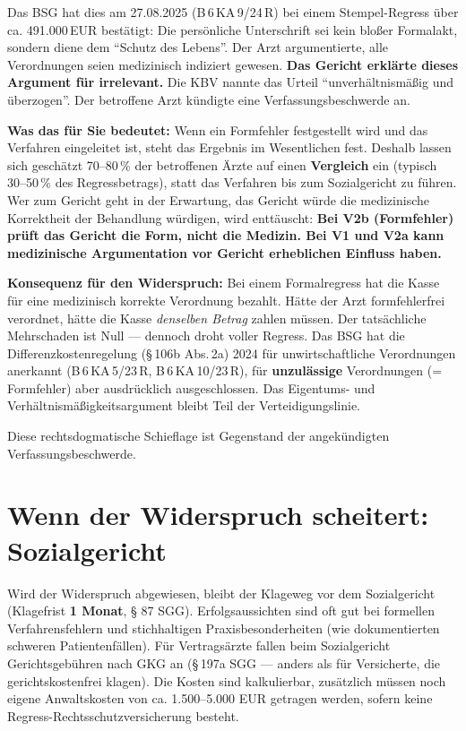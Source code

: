 \documentclass[a4paper]{umbruch-position}
\begin{document}
Das BSG hat dies am 27.08.2025 (B\,6\,KA\,9/24\,R) bei einem Stempel-Regress \"uber ca. 491.000\,EUR best\"atigt: Die pers\"onliche Unterschrift sei kein blo\ss{}er Formalakt, sondern diene dem ``Schutz des Lebens''. Der Arzt argumentierte, alle Verordnungen seien medizinisch indiziert gewesen. \textbf{Das Gericht erkl\"arte dieses Argument f\"ur irrelevant.} Die KBV nannte das Urteil ``unverh\"altnism\"a\ss{}ig und \"uberzogen''. Der betroffene Arzt k\"undigte eine Verfassungsbeschwerde an.

\textbf{Was das f\"ur Sie bedeutet:} Wenn ein Formfehler festgestellt wird und das Verfahren eingeleitet ist, steht das Ergebnis im Wesentlichen fest. Deshalb lassen sich gesch\"atzt 70--80\,\% der betroffenen \"Arzte auf einen \textbf{Vergleich} ein (typisch 30--50\,\% des Regressbetrags), statt das Verfahren bis zum Sozialgericht zu f\"uhren. Wer zum Gericht geht in der Erwartung, das Gericht w\"urde die medizinische Korrektheit der Behandlung w\"urdigen, wird entt\"auscht: \textbf{Bei V2b (Formfehler) pr\"uft das Gericht die Form, nicht die Medizin. Bei V1 und V2a kann medizinische Argumentation vor Gericht erheblichen Einfluss haben.}

\textbf{Konsequenz f\"ur den Widerspruch:} Bei einem Formalregress hat die Kasse f\"ur eine medizinisch korrekte Verordnung bezahlt. H\"atte der Arzt formfehlerfrei verordnet, h\"atte die Kasse \textit{denselben Betrag} zahlen m\"ussen. Der tats\"achliche Mehrschaden ist Null --- dennoch droht voller Regress. Das BSG hat die Differenzkostenregelung (\S\,106b Abs.\,2a) 2024 f\"ur unwirtschaftliche Verordnungen anerkannt (B\,6\,KA\,5/23\,R, B\,6\,KA\,10/23\,R), f\"ur \textbf{unzul\"assige} Verordnungen (= Formfehler) aber ausdr\"ucklich ausgeschlossen. Das Eigentums- und Verh\"altnism\"a\ss{}igkeitsargument bleibt Teil der Verteidigungslinie.

Diese rechtsdogmatische Schieflage ist Gegenstand der angek\"undigten Verfassungsbeschwerde.

\section{Wenn der Widerspruch scheitert: Sozialgericht}

Wird der Widerspruch abgewiesen, bleibt der Klageweg vor dem Sozialgericht (Klagefrist \textbf{1 Monat}, § 87 SGG).
Erfolgsaussichten sind oft gut bei formellen Verfahrensfehlern und stichhaltigen Praxisbesonderheiten (wie dokumentierten schweren Patientenf\"allen).
F\"ur Vertrags\"arzte fallen beim Sozialgericht Gerichtsgeb\"uhren nach GKG an (\S\,197a SGG --- anders als f\"ur Versicherte, die gerichtskostenfrei klagen). Die Kosten sind kalkulierbar, zus\"atzlich m\"ussen noch eigene Anwaltskosten von ca. 1.500--5.000 EUR getragen werden, sofern keine Regress-Rechtsschutzversicherung besteht.
\end{document}
